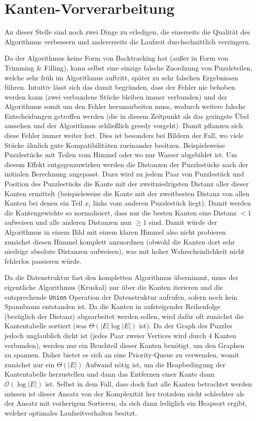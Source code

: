 \documentclass{whswinvcbook}
\begin{document}
\section{Kanten-Vorverarbeitung}
An dieser Stelle sind noch zwei Dinge zu erledigen, die einerseits die Qualität des Algorithmus verbessern und andererseits die Laufzeit durchschnittlich verringern.

Da der Algorithmus keine Form von Backtracking hat (außer in Form von Trimming \& Filling), kann selbst eine einzige falsche Zuordnung von Puzzleteilen, welche sehr früh im Algorithmus auftritt, später zu sehr falschen Ergebnissen führen. Intuitiv lässt sich das damit begründen, dass der Fehler nie behoben werden kann (zwei verbundene Stücke bleiben immer verbunden) und der Algorithmus somit um den Fehler herumarbeiten muss, wodurch weitere falsche Entscheidungen getroffen werden (die in diesem Zeitpunkt als das geringste Übel aussehen und der Algorithmus schließlich greedy vorgeht). Damit pflanzen sich diese Fehler immer weiter fort. Dies ist besonders bei Bildern der Fall, wo viele Stücke ähnlich gute Kompatibilitäten zueinander besitzen. Beispielsweise Puzzlestücke mit Teilen vom Himmel oder wo nur Wasser abgebildet ist. Um diesem Effekt entgegenzuwirken werden die Distanzen der Puzzlestücke nach der initialen Berechnung angepasst. Dazu wird zu jedem Paar von Puzzlestück und Position des Puzzlestücks die Kante mit der zweitniedrigsten Distanz aller dieser Kanten ermittelt (beispielsweise die Kante mit der zweitbesten Distanz von allen Kanten bei denen ein Teil $x_i$ links vom anderen Puzzlestück liegt).\cite{gallagher,crisjim} Damit werden die Kantengewichte so normalisiert, dass nur die besten Kanten eine Distanz $<1$ aufweisen und alle anderen Distanzen nun $\geq1$ sind. Damit würde der Algorithmus in einem Bild mit einem klaren Himmel also nicht probieren zunächst diesen Himmel komplett anzuordnen (obwohl die Kanten dort sehr niedrige absolute Distanzen aufweisen), was mit hoher Wahrscheinlichkeit nicht fehlerlos passieren würde.

Da die Datenstruktur fast den kompletten Algorithmus übernimmt, muss der eigentliche Algorithmus (Kruskal) nur über die Kanten iterieren und die entsprechende \texttt{Union} Operation der Datenstruktur aufrufen, sofern noch kein Spannbaum entstanden ist. Da die Kanten in aufsteigender Reihenfolge (bezüglich der Distanz) abgearbeitet werden sollen, wird dafür oft zunächst die Kantentabelle sortiert (was $\Theta(|E|\log|E|)$ ist). Da der Graph des Puzzles jedoch unglaublich dicht ist (jedes Paar zweier Vertices wird durch $4$ Kanten verbunden), werden nur ein Bruchteil dieser Kanten benötigt, um den Graphen zu spannen. Daher bietet es sich an eine Priority-Queue zu verwenden, womit zunächst nur ein $\Theta(|E|)$ Aufwand nötig ist, um die Heapbedingung der Kantentabelle herzustellen und dann das Entfernen einer Kante dann $\mathcal{O}(\log|E|)$ ist. Selbst in dem Fall, dass doch fast alle Kanten betrachtet werden müssen ist dieser Ansatz von der Komplexität her trotzdem nicht schlechter als der Ansatz mit vorherigem Sortieren, da sich dann lediglich ein Heapsort ergibt, welcher optimales Laufzeitverhalten besitzt.
\end{document}
